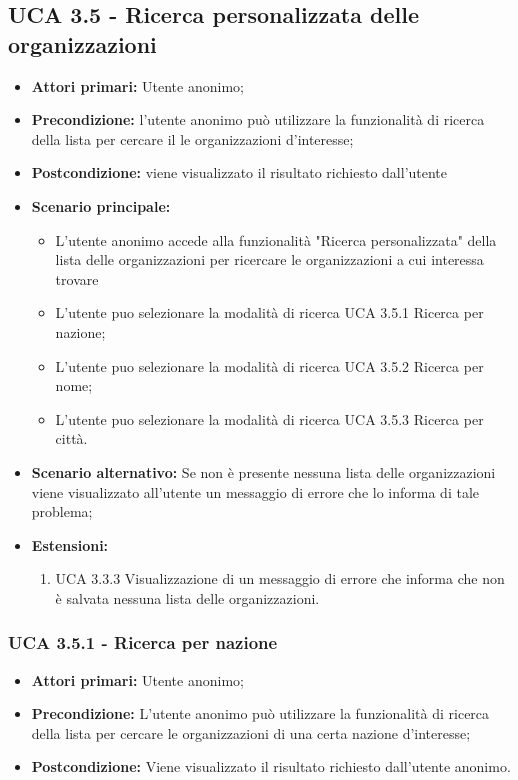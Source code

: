 \subsection{UCA 3.5 - Ricerca personalizzata delle organizzazioni}%
\begin{itemize}
	\item \textbf{Attori primari:} Utente anonimo;
	\item \textbf{Precondizione:} l’utente anonimo può utilizzare la funzionalità di ricerca della lista per cercare il le organizzazioni d’interesse;
	\item \textbf{Postcondizione:} viene visualizzato il risultato richiesto dall’utente
	\item \textbf{Scenario principale:}
	\begin{itemize}
		\item L’utente anonimo accede alla funzionalità "Ricerca personalizzata" della lista delle organizzazioni per ricercare le organizzazioni a cui interessa trovare
		\item L'utente puo selezionare la modalità di ricerca UCA 3.5.1 Ricerca per nazione;
		\item L'utente puo selezionare la modalità di ricerca UCA 3.5.2 Ricerca per nome;
		\item L'utente puo selezionare la modalità di ricerca UCA 3.5.3 Ricerca per città.
	\end{itemize}
	\item \textbf{Scenario alternativo:} Se non è presente nessuna lista delle organizzazioni viene visualizzato all’utente un messaggio di errore che lo informa di tale problema;
	\item \textbf{Estensioni:}
	\begin{enumerate}
		\item UCA 3.3.3 Visualizzazione di un messaggio di errore che informa che non è salvata nessuna lista delle organizzazioni.
	\end{enumerate}
\end{itemize}

\subsubsection{UCA 3.5.1 - Ricerca per nazione}%
\begin{itemize}
	\item \textbf{Attori primari:} Utente anonimo;
	\item \textbf{Precondizione:} L’utente anonimo può utilizzare la funzionalità di ricerca della lista per cercare le organizzazioni di una certa nazione d’interesse;
	\item \textbf{Postcondizione:} Viene visualizzato il risultato richiesto dall’utente anonimo.
\end{itemize}

